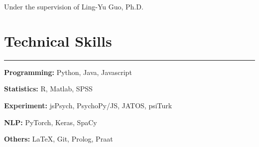\documentclass[11pt]{article}
\newcommand{\resumesection}[1]{\vspace{-0.2cm}\section*{#1}\vspace{-0.2cm}\hrule\vspace{0.2cm}}
\begin{document}
\quad Under the supervision of Ling-Yu Guo, Ph.D.

\resumesection{Technical Skills}

\textbf{Programming:} Python, Java, Javascript

\textbf{Statistics:} R, Matlab, SPSS

\textbf{Experiment:} jsPsych, PsychoPy/JS, JATOS, psiTurk

\textbf{NLP:} PyTorch, Keras, SpaCy

\textbf{Others:} \LaTeX, Git, Prolog, Praat




\end{document}
